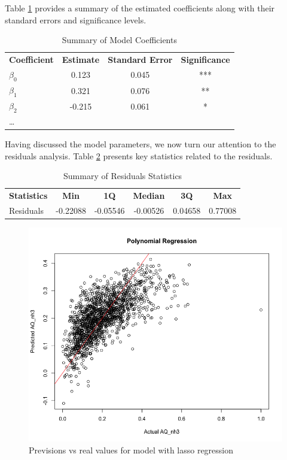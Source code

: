 \documentclass[10pt]{article} %
\begin{document}
Table \ref{tab:coefficients} provides a summary of the estimated coefficients along with their standard errors and significance levels.

\begin{table}[ht]
    \centering
    \begin{tabular}{lccc}
        
        \textbf{Coefficient} & \textbf{Estimate} & \textbf{Standard Error} & \textbf{Significance} \\
        $\beta_0$ & 0.123 & 0.045 & *** \\
        $\beta_1$ & 0.321 & 0.076 & ** \\
        $\beta_2$ & -0.215 & 0.061 & * \\
        \ldots & & & \\
    \end{tabular}
    \caption{Summary of Model Coefficients}
    \label{tab:coefficients}
\end{table}


Having discussed the model parameters, we now turn our attention to the residuals analysis. Table \ref{tab:residuals-summary} presents key statistics related to the residuals.

\begin{table}[ht]
    \centering
    \begin{tabular}{lccccc}
        \textbf{Statistics} & \textbf{Min} & \textbf{1Q} & \textbf{Median} & \textbf{3Q} & \textbf{Max} \\
        Residuals & -0.22088 & -0.05546 & -0.00526 & 0.04658 & 0.77008 \\
    \end{tabular}
    \caption{Summary of Residuals Statistics}
    \label{tab:residuals-summary}
\end{table}
    \begin{figure}[h]
        \centering
        \includegraphics[scale=0.45]{Assets/Polynomial1.png}
        \caption{Previsions vs real values for model with lasso regression}
        \label{fig:enter-label}
    \end{figure}
\end{document}
